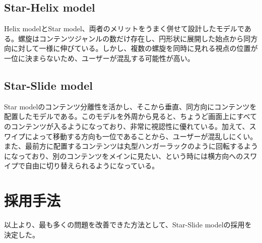 \subsection{Star-Helix model}
Helix modelとStar model、両者のメリットをうまく併せて設計したモデルである。螺旋はコンテンツジャンルの数だけ存在し、円形状に展開した始点から同方向に対して一様に伸びている。しかし、複数の螺旋を同時に見れる視点の位置が一位に決まらないため、ユーザーが混乱する可能性が高い。

\subsection{Star-Slide model}
Star modelのコンテンツ分離性を活かし、そこから垂直、同方向にコンテンツを配置したモデルである。このモデルを外周から見ると、ちょうど画面上にすべてのコンテンツが入るようになっており、非常に視認性に優れている。加えて、スワイプによって移動する方向も一位であることから、ユーザーが混乱しにくい。また、最前方に配置するコンテンツは丸型ハンガーラックのように回転するようになっており、別のコンテンツをメインに見たい、という時には横方向へのスワイプで自由に切り替えられるようになっている。

\section{採用手法}
以上より、最も多くの問題を改善できた方法として、Star-Slide modelの採用を決定した。